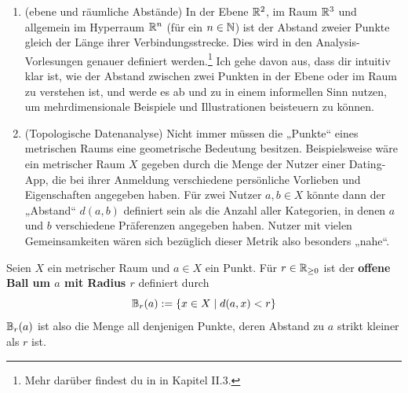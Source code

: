 \begin{bsp} \quad
    \begin{enumerate}
        \item(ebene und räumliche Abstände) In der Ebene $\mathbb R^2$, im Raum $\mathbb R^3$ und allgemein im Hyperraum $\mathbb R^n$ (für ein $n\in \mathbb N$) ist der Abstand zweier Punkte gleich der Länge ihrer Verbindungsstrecke. Dies wird in den Analysis-Vorlesungen genauer definiert werden.\footnote{Mehr darüber findest du in \cite{AE06} in Kapitel II.3.} Ich gehe davon aus, dass dir intuitiv klar ist, wie der Abstand zwischen zwei Punkten in der Ebene oder im Raum zu verstehen ist, und werde es ab und zu in einem informellen Sinn nutzen, um mehrdimensionale Beispiele und Illustrationen beisteuern zu können.
        \item(Topologische Datenanalyse) Nicht immer müssen die „Punkte“ eines metrischen Raums eine geometrische Bedeutung besitzen. Beispielsweise wäre ein metrischer Raum $X$ gegeben durch die Menge der Nutzer einer Dating-App, die bei ihrer Anmeldung verschiedene persönliche Vorlieben und Eigenschaften angegeben haben. Für zwei Nutzer $a,b\in X$ könnte dann der „Abstand“ $d(a,b)$ definiert sein als die Anzahl aller Kategorien, in denen $a$ und $b$ verschiedene Präferenzen angegeben haben. Nutzer mit vielen Gemeinsamkeiten wären sich bezüglich dieser Metrik also besonders „nahe“.
    \end{enumerate}
\end{bsp}


\begin{de} \label{def:ball} 
    Seien $X$ ein metrischer Raum und $a\in X$ ein Punkt. Für $r\in \mathbb R_{\ge 0}$ ist der \textbf{offene Ball um $a$ mit Radius $r$} definiert durch
        \[ \mathbb B_r(a) := \{ x\in X \mid d(a,x)< r\} \]
    $\mathbb B_r(a)$ ist also die Menge all denjenigen Punkte, deren Abstand zu $a$ strikt kleiner als $r$ ist.
\end{de}


